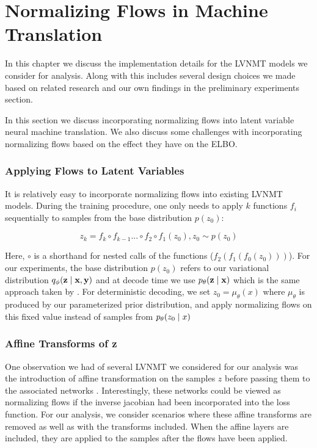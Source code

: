 \chapter{Normalizing Flows in Machine Translation}

In this chapter we discuss the implementation details for the \ac{LVNMT} models we consider for analysis. Along with this includes several design choices we made based on related research and our own findings in the preliminary experiments section. 


In this section we discuss incorporating normalizing flows into latent variable neural machine translation. We also discuss some challenges with incorporating normalizing flows based on the effect they have on the ELBO. 


\subsection{Applying Flows to Latent Variables}
It is relatively easy to incorporate normalizing flows into existing LVNMT models. During the training procedure, one only needs to apply $k$ functions $f_{i}$ sequentially to samples from the base distribution $p(z_{0})$: 

\begin{equation}
z_{k} = f_{k} \circ f_{k-1} ... \circ f_{2} \circ f_{1}(z_{0}) , z_{0} \sim p(z_{0})
\end{equation}

Here, $\circ$ is a shorthand for nested calls of the functions ($f_{2}(f_{1}(f_{0}(z_{0})))$). For our experiments, the base distribution $p(z_{0})$ refers to our variational distribution $q_{\phi}(\textbf{z} \; | \;{\textbf{x}, \textbf{y}})$ and at decode time we use $p_{\theta}(\textbf{z} \; | \;{\textbf{x}})$ which is the same approach taken by \citet{Zhang2016VNMT}. For deterministic decoding, we set $z_{0} = \mu_{\theta}(x)$ where $\mu_{\theta}$ is produced by our parameterized prior distribution, and apply normalizing flows on this fixed value instead of samples from $p_{\theta}(z_{0} \; | \;{x})$

\subsection{Affine Transforms of z}

One observation we had of several \ac{LVNMT} we considered for our analysis was the introduction of affine transformation on the samples $z$ before passing them to the associated networks \cite{eikema2018AEVNMT,Zhang2016VNMT}. Interestingly, these networks could be viewed as normalizing flows if the inverse jacobian had been incorporated into the loss function. For our analysis, we consider scenarios where these affine transforms are removed as well as with the transforms included. When the affine layers are included, they are applied to the samples after the flows have been applied. 


